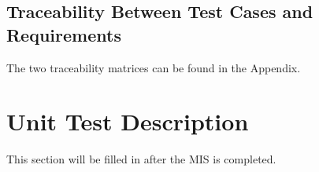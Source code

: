 \documentclass[12pt, titlepage]{article}
\begin{document}
\subsection{Traceability Between Test Cases and Requirements}

The two traceability matrices can be found in the Appendix.

\section{Unit Test Description}
This section will be filled in after the MIS is completed.

%
%
%
%
%
%
%
%
%
%
%
%
\end{document}
